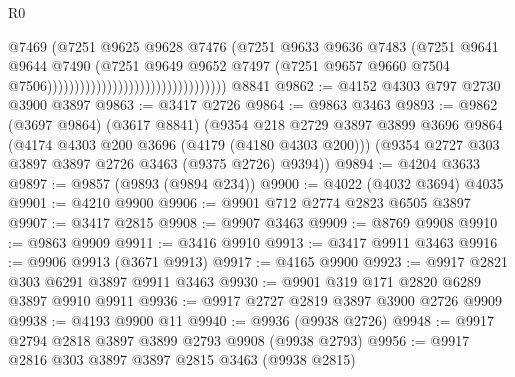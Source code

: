 \begin{lexlean}{R0}
\begin{coremodule}
                                                            @7469
                                                            (@7251
                                                              @9625
                                                              @9628
                                                              @7476
                                                              (@7251
                                                                @9633
                                                                @9636
                                                                @7483
                                                                (@7251
                                                                  @9641
                                                                  @9644
                                                                  @7490
                                                                  (@7251
                                                                    @9649
                                                                    @9652
                                                                    @7497
                                                                    (@7251
                                                                      @9657
                                                                      @9660
                                                                      @7504
                                                                      @7506)))))))))))))))))))))))))))))))))
    @8841
@9862 := @4152 @4303 @797 @2730 @3900 @3897
@9863 := @3417 @2726
@9864 := @9863 @3463
@9893 := @9862
    (@3697 @9864)
    (@3617 @8841)
    (@9354
      @218
      @2729
      @3897
      @3899
      @3696
      @9864
      (@4174 @4303 @200 @3696 (@4179 (@4180 @4303 @200)))
      (@9354 @2727 @303 @3897 @3897 @2726 @3463 (@9375 @2726) @9394))
@9894 := @4204 @3633
@9897 := @9857 (@9893 (@9894 @234))
@9900 := @4022 (@4032 @3694) @4035
@9901 := @4210 @9900
@9906 := @9901 @712 @2774 @2823 @6505 @3897
@9907 := @3417 @2815
@9908 := @9907 @3463
@9909 := @8769 @9908
@9910 := @9863 @9909
@9911 := @3416 @9910
@9913 := @3417 @9911 @3463
@9916 := @9906 @9913 (@3671 @9913)
@9917 := @4165 @9900
@9923 := @9917 @2821 @303 @6291 @3897 @9911 @3463
@9930 := @9901 @319 @171 @2820 @6289 @3897 @9910 @9911
@9936 := @9917 @2727 @2819 @3897 @3900 @2726 @9909
@9938 := @4193 @9900 @11
@9940 := @9936 (@9938 @2726)
@9948 := @9917 @2794 @2818 @3897 @3899 @2793 @9908 (@9938 @2793)
@9956 := @9917 @2816 @303 @3897 @3897 @2815 @3463 (@9938 @2815)

\end{coremodule}
\end{lexlean}
